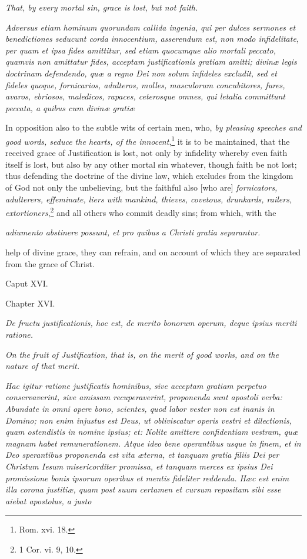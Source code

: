 \emph{That, by every mortal sin, grace is lost, but not faith.}

\emph{Adversus etiam hominum quorundam callida ingenia, qui per dulces sermones et benedictiones seducunt corda innocentium, asserendum est, non modo infidelitate, per quam et ipsa fides amittitur, sed etiam quocumque alio mortali peccato, quamvis non amittatur fides, acceptam justificationis gratiam amitti; divinæ legis doctrinam defendendo, quæ a regno Dei non solum infideles excludit, sed et fideles quoque, fornicarios, adulteros, molles, masculorum concubitores, fures, avaros, ebriosos, maledicos, rapaces, ceterosque omnes, qui letalia committunt peccata, a quibus cum divinæ gratiæ }

In opposition also to the subtle wits of certain men, who, \emph{by pleasing speeches and good words, seduce the hearts, of the innocent},\footnote{\par   Rom. xvi. 18.} it is to be maintained, that the received grace of Justification is lost, not only by infidelity whereby even faith itself is lost, but also by any other mortal sin whatever, though faith be not lost; thus defending the doctrine of the divine law, which excludes from the kingdom of God not only the unbelieving, but the faithful also [who are] \emph{fornicators, adulterers, effeminate, liers with mankind, thieves, covetous, drunkards, railers, extortioners},\footnote{\par  1 Cor. vi. 9, 10.} and all others who commit deadly sins; from which, with the

\emph{adiumento abstinere possunt, et pro quibus a Christi gratia separantur.}

help of divine grace, they can refrain, and on account of which they are separated from the grace of Christ.

Caput XVI.

Chapter XVI.

\emph{De fructu justificationis, hoc est, de merito bonorum operum, deque ipsius meriti ratione.}

\emph{On the fruit of Justification, that is, on the merit of good works, and on the nature of that merit.}

\emph{Hac igitur ratione justificatis hominibus, sive acceptam gratiam perpetuo conservaverint, sive amissam recuperaverint, proponenda sunt apostoli verba: Abundate in omni opere bono, scientes, quod labor vester non est inanis in Domino; non enim injustus est Deus, ut obliviscatur operis vestri et dilectionis, quam ostendistis in nomine ipsius; et: Nolite amittere confidentiam vestram, quæ magnam habet remunerationem. Atque ideo bene operantibus usque in finem, et in Deo sperantibus proponenda est vita æterna, et tanquam gratia filiis Dei per Christum Iesum misericorditer promissa, et tanquam merces ex ipsius Dei promissione bonis ipsorum operibus et mentis fideliter reddenda. Hæc est enim illa corona justitiæ, quam post suum certamen et cursum repositam sibi esse aiebat apostolus, a justo }

